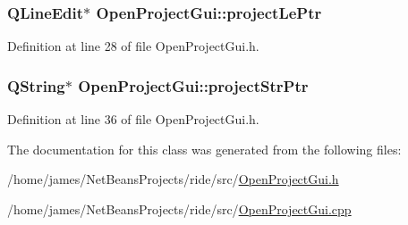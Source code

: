 \hypertarget{class_open_project_gui_ae36ed1a918868075f2cbadb359dafdbb}{
\subsubsection[{project\-Le\-Ptr}]{\setlength{\rightskip}{0pt plus 5cm}Q\-Line\-Edit$\ast$ Open\-Project\-Gui\-::project\-Le\-Ptr\hspace{0.3cm}{\ttfamily [private]}}}\label{class_open_project_gui_ae36ed1a918868075f2cbadb359dafdbb}


Definition at line 28 of file Open\-Project\-Gui.\-h.

\hypertarget{class_open_project_gui_aadab89933dc3fe2a0bbdb1f1b7e886b7}{
\subsubsection[{project\-Str\-Ptr}]{\setlength{\rightskip}{0pt plus 5cm}Q\-String$\ast$ Open\-Project\-Gui\-::project\-Str\-Ptr\hspace{0.3cm}{\ttfamily [private]}}}\label{class_open_project_gui_aadab89933dc3fe2a0bbdb1f1b7e886b7}


Definition at line 36 of file Open\-Project\-Gui.\-h.



The documentation for this class was generated from the following files\-:\begin{DoxyCompactItemize}
\item 
/home/james/\-Net\-Beans\-Projects/ride/src/\hyperlink{_open_project_gui_8h}{Open\-Project\-Gui.\-h}\item 
/home/james/\-Net\-Beans\-Projects/ride/src/\hyperlink{_open_project_gui_8cpp}{Open\-Project\-Gui.\-cpp}\end{DoxyCompactItemize}
